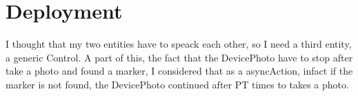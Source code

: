 \documentclass[a4paper]{article}
\begin{document}

\section{Deployment }
I thought that my two entities have to speack each other, so I need a third entity, a generic Control. A part of this, the fact that the DevicePhoto have to stop after take a photo and found a marker, I considered that as a asyncAction, infact if the marker is not found, the DevicePhoto continued after PT times to takes a photo. 

\end{document}
